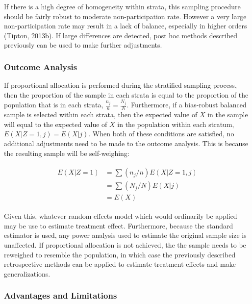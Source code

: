 \documentclass[man,floatsintext]{apa6}
\theoremstyle{definition}
\theoremstyle{definition}
\theoremstyle{definition}
\theoremstyle{remark}
\begin{document}
If there is a high degree of homogeneity within strata, this sampling
procedure should be fairly robust to moderate non-participation rate.
However a very large non-participation rate may result in a lack of
balance, especially in higher orders (Tipton, 2013b). If large
differences are detected, post hoc methods described previously can be
used to make further adjustments.

\hypertarget{outcome-analysis}{%
\subsubsection{Outcome Analysis}\label{outcome-analysis}}

If proportional allocation is performed during the stratified sampling
process, then the proportion of the sample in each strata is equal to
the proportion of the population that is in each strata,
\(\frac{n_j}{n} = \frac{N_j}{N}\). Furthermore, if a bias-robust
balanced sample is selected within each strata, then the expected value
of \(X\) in the sample will equal to the expected value of \(X\) in the
population within each stratum, \(E(X|Z=1,j) = E(X|j)\). When both of
these conditions are satisfied, no additional adjustments need to be
made to the outcome analysis. This is because the resulting sample will
be self-weighing:

\begin{align}
  \begin{split}
    E(X | Z = 1) &= \sum{(n_j/n)E(X | Z = 1, j)} \\
      &= \sum{(N_j/N)E(X | j)} \\
      &= E(X)
  \end{split}
\end{align}

Given this, whatever random effects model which would ordinarily be
applied may be use to estimate treatment effect. Furthermore, because
the standard estimator is used, any power analysis used to estimate the
original sample size is unaffected. If proportional allocation is not
achieved, the the sample needs to be reweighed to resemble the
population, in which case the previously described retrospective methods
can be applied to estimate treatment effects and make generalizations.

\hypertarget{advantages-and-limitations}{%
\subsubsection{Advantages and
Limitations}\label{advantages-and-limitations}}
\end{document}
